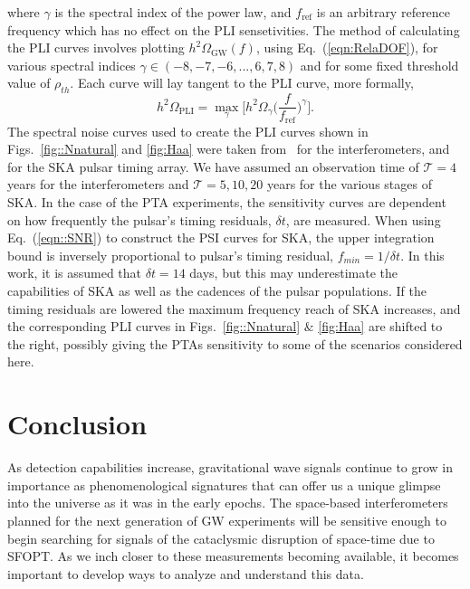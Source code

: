 \documentclass[nofootinbib,twocolumn,preprintnumbers]{revtex4-1}
\begin{document}
where $\gamma$ is the spectral index of the power law, and $f_{\textrm{ref}}$ is an arbitrary reference frequency which has no effect on the PLI sensetivities. 
The method of calculating the PLI curves involves plotting $h^2 \Omega_{\textrm{GW}}(f) $, using Eq.~(\ref{eqn:RelaDOF}), for various spectral indices $\gamma \in (-8,-7,-6, ... , 6, 7, 8)$ and for some fixed threshold value of $\rho_{th}$. Each curve will lay tangent to the PLI curve, more formally,
\begin{equation}
h^2 \Omega_{\textrm{PLI}} = \max\limits_{\gamma}\bigg[ h^2 \Omega_{\gamma}\bigg(\frac{f}{f_{\textrm{ref}}}\bigg)^{\gamma}  \bigg].
\end{equation}
The spectral noise curves used to create the PLI curves shown in Figs.~\ref{fig::Nnatural} and \ref{fig:Haa} were taken 
from~\citep{Robson_2019,PhysRevD.83.084036,doi:10.1142/S0218271813410137,10.1093/ptep/pty078, Breitbach:2018ddu} for the interferometers, and~\citep{Breitbach:2018ddu, Janssen:2014dka} 
for the SKA pulsar timing array. 
We have assumed an observation time of $\mathcal{T} = 4 $ years for the interferometers and $\mathcal{T}= 5, 10, 20 $  years for the various stages of SKA. 
In the case of the PTA experiments, the sensitivity curves are dependent on how frequently the pulsar's timing residuals, $\delta t$, are measured. 
When using Eq.~(\ref{eqn::SNR}) to construct the PSI curves for SKA, the upper integration bound is inversely proportional to pulsar's timing residual, $f_{min} = 1/\delta t$.  In this work, it is assumed that $\delta t = 14$ days, but this may underestimate the capabilities of SKA as well as the cadences of the pulsar populations. If the timing residuals are lowered the maximum frequency reach of SKA increases, and the corresponding PLI curves in Figs.~\ref{fig::Nnatural} $\&$ \ref{fig:Haa} are shifted to the right, possibly giving the PTAs sensitivity to some of the scenarios considered here.


\section{Conclusion}
\label{sec:conclusion}

As detection capabilities increase, gravitational wave signals continue to grow in importance as phenomenological signatures that can offer us a unique glimpse into the universe as it was in the early epochs. The space-based interferometers planned for the next generation of GW experiments will be sensitive enough to begin searching for signals of the cataclysmic disruption of space-time due to SFOPT. As we inch closer to these measurements becoming available, it becomes important to develop ways to analyze and understand this data.
\end{document}
